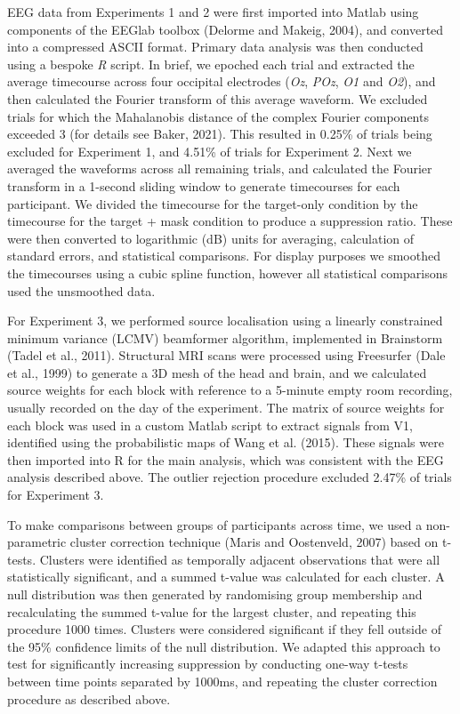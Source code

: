 \documentclass[
]{article}
\begin{document}
EEG data from Experiments 1 and 2 were first imported into Matlab using components of the EEGlab toolbox (Delorme and Makeig, 2004), and converted into a compressed ASCII format. Primary data analysis was then conducted using a bespoke \emph{R} script. In brief, we epoched each trial and extracted the average timecourse across four occipital electrodes (\emph{Oz}, \emph{POz}, \emph{O1} and \emph{O2}), and then calculated the Fourier transform of this average waveform. We excluded trials for which the Mahalanobis distance of the complex Fourier components exceeded 3 (for details see Baker, 2021). This resulted in 0.25\% of trials being excluded for Experiment 1, and 4.51\% of trials for Experiment 2. Next we averaged the waveforms across all remaining trials, and calculated the Fourier transform in a 1-second sliding window to generate timecourses for each participant. We divided the timecourse for the target-only condition by the timecourse for the target + mask condition to produce a suppression ratio. These were then converted to logarithmic (dB) units for averaging, calculation of standard errors, and statistical comparisons. For display purposes we smoothed the timecourses using a cubic spline function, however all statistical comparisons used the unsmoothed data.

For Experiment 3, we performed source localisation using a linearly constrained minimum variance (LCMV) beamformer algorithm, implemented in Brainstorm (Tadel et al., 2011). Structural MRI scans were processed using Freesurfer (Dale et al., 1999) to generate a 3D mesh of the head and brain, and we calculated source weights for each block with reference to a 5-minute empty room recording, usually recorded on the day of the experiment. The matrix of source weights for each block was used in a custom Matlab script to extract signals from V1, identified using the probabilistic maps of Wang et al. (2015). These signals were then imported into R for the main analysis, which was consistent with the EEG analysis described above. The outlier rejection procedure excluded 2.47\% of trials for Experiment 3.

To make comparisons between groups of participants across time, we used a non-parametric cluster correction technique (Maris and Oostenveld, 2007) based on t-tests. Clusters were identified as temporally adjacent observations that were all statistically significant, and a summed t-value was calculated for each cluster. A null distribution was then generated by randomising group membership and recalculating the summed t-value for the largest cluster, and repeating this procedure 1000 times. Clusters were considered significant if they fell outside of the 95\% confidence limits of the null distribution. We adapted this approach to test for significantly increasing suppression by conducting one-way t-tests between time points separated by 1000ms, and repeating the cluster correction procedure as described above.
\end{document}
